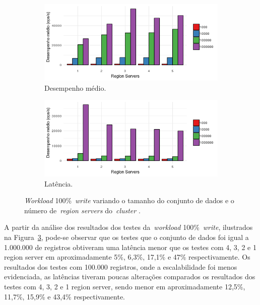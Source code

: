 \documentclass[12pt]{article}
\begin{document}
\begin{figure}[!ht]
    \centering
    \begin{subfigure}[b]{0.49\textwidth}
        \centering
        \includegraphics[width=\textwidth]{images/figura15}
        \caption{Desempenho médio.}
        \label{figura15}
    \end{subfigure}
        \hfill
    \begin{subfigure}[b]{0.49\textwidth}  
        \centering 
        \includegraphics[width=\textwidth]{images/figura16}
        \caption{Latência.}
        \label{figura16}
    \end{subfigure}
    \caption{\emph{Workload} 100\%~\emph{write} variando o tamanho do conjunto de dados e o número de~\emph{region servers} do~\emph{cluster} .}
\end{figure}

A partir da análise dos resultados dos testes da~\emph{workload} 100\%~\emph{write}, ilustrados na Figura~\ref{figura16}, pode-se observar que os testes que o conjunto de dados foi igual a 1.000.000 de registros obtiveram uma latência menor que os testes com 4, 3, 2 e 1 region server em aproximadamente 5\%, 6,3\%, 17,1\% e 47\% respectivamente. Os resultados dos testes com 100.000 registros, onde a escalabilidade foi menos evidenciada, as latências tiveram poucas alterações comparados os resultados dos testes com 4, 3, 2 e 1 region server, sendo menor em aproximadamente 12,5\%, 11,7\%, 15,9\% e 43,4\% respectivamente.
\end{document}

